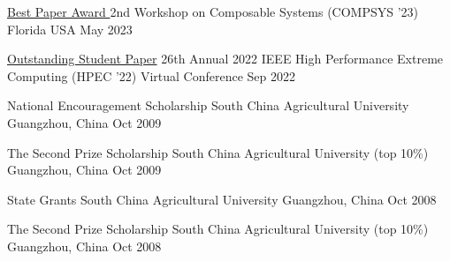 



\begin{cvhonors}

  \cvhonor
    {\href{https://compsysworkshop.github.io/compsys23/program.html}{Best Paper Award
}} %
    {2nd Workshop on Composable Systems (COMPSYS '23)} %
    {Florida USA} %
    {May 2023} %

  \cvhonor
    {\href{https://ieee-hpec.org/index.php/ieee-hpec-2022-prelim-agenda/}{Outstanding Student Paper}} %
    {26th Annual 2022 IEEE High Performance Extreme Computing (HPEC '22)} %
    {Virtual Conference} %
    {Sep 2022} %

  \cvhonor
    {National Encouragement Scholarship} %
    {South China Agricultural University} %
    {Guangzhou, China} %
    {Oct 2009} %

  \cvhonor
    {The Second Prize Scholarship} %
    {South China Agricultural University (top 10\%)} %
    {Guangzhou, China} %
    {Oct 2009} %

  \cvhonor
    {State Grants} %
    {South China Agricultural University} %
    {Guangzhou, China} %
    {Oct 2008} %

  \cvhonor
    {The Second Prize Scholarship} %
    {South China Agricultural University (top 10\%)} %
    {Guangzhou, China} %
    {Oct 2008} %

\end{cvhonors}
